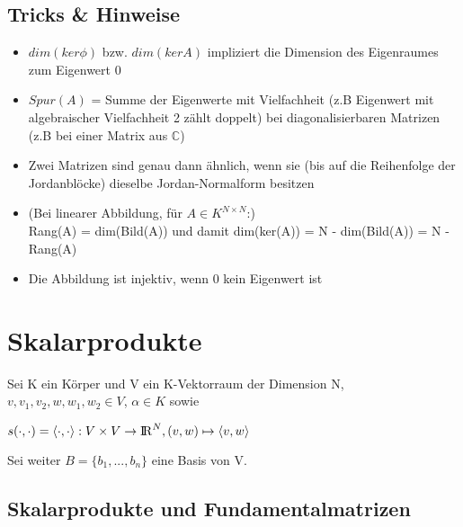 \documentclass[10pt,a4paper]{article}
\def\realnumbers{{\rm I\!R}}
\def\complexnumbers{{\mathbb{C}}}
\begin{document}
	\subsection{Tricks \& Hinweise}
	\label{jd:sub:tricks}
	
	\begin{itemize}
		\item $dim(ker \phi)$ bzw. $dim(ker A)$ impliziert die Dimension des Eigenraumes zum Eigenwert 0
		\item $Spur(A)$ = Summe der Eigenwerte mit Vielfachheit (z.B Eigenwert mit algebraischer Vielfachheit 2 zählt doppelt) bei diagonalisierbaren Matrizen (z.B bei einer Matrix aus $\complexnumbers$)
		\item Zwei Matrizen sind genau dann ähnlich, wenn sie (bis auf die Reihenfolge der Jordanblöcke) dieselbe Jordan-Normalform besitzen
		\item (Bei linearer Abbildung, für $A \in K^{N\times N}$:)\\Rang(A) = dim(Bild(A)) und damit dim(ker(A)) = N - dim(Bild(A)) = N - Rang(A)
		\item Die Abbildung ist injektiv, wenn 0 kein Eigenwert ist
	\end{itemize}
	
	\newpage
	\section{Skalarprodukte}
	\label{sp:sec:skalarprodukte}
	
	Sei K ein Körper und V ein K-Vektorraum der Dimension N, $v, v_1, v_2, w, w_1, w_2 \in V$, $\alpha \in K$ sowie
	\begin{center}
		$s(\cdot,\cdot) = \langle\cdot,\cdot\rangle: V \times V \rightarrow \realnumbers^N, (v, w) \mapsto \langle v, w\rangle$
	\end{center}
	Sei weiter $B = \{b_1, ..., b_n\}$ eine Basis von V.
	
	\subsection{Skalarprodukte und Fundamentalmatrizen}
	\label{sp:sub:skalarprodukte_und_fundamentalmatrizen}
	
\end{document}
